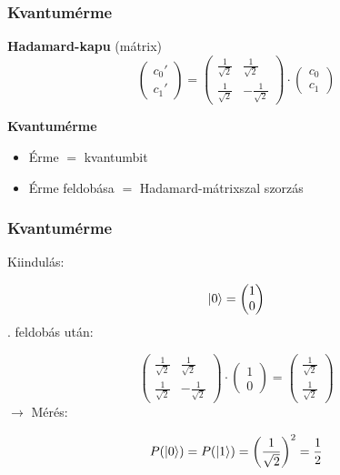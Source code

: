 \documentclass[aspectratio=169]{beamer}
\begin{document}
\begin{frame}
  \frametitle{Kvantumérme}

  \textbf{Hadamard-kapu} (mátrix)
  \[\begin{pmatrix} c_0' \\ c_1'
    \end{pmatrix} = \begin{pmatrix} \frac{1}{\sqrt{2}} & \frac{1}{\sqrt{2}}
      \\ \frac{1}{\sqrt{2}} & -\frac{1}{\sqrt{2}}\end{pmatrix} \cdot
    \begin{pmatrix} c_0 \\ c_1 \end{pmatrix}\]

  \pause
  \textbf{Kvantumérme}\\
  \begin{itemize}
    \item Érme $=$ kvantumbit
    \item Érme feldobása $=$ Hadamard-mátrixszal szorzás
  \end{itemize}
\end{frame}

\begin{frame}
  \frametitle{Kvantumérme}

  Kiindulás:

  \[\ket{0} = \begin{pmatrix} 1 \\ 0 \end{pmatrix}\]
  . feldobás után:

  \[\begin{pmatrix} \frac{1}{\sqrt{2}} & \frac{1}{\sqrt{2}}
      \\ \frac{1}{\sqrt{2}} & -\frac{1}{\sqrt{2}}\end{pmatrix} \cdot
    \begin{pmatrix} 1 \\ 0 \end{pmatrix} = \begin{pmatrix}
      \frac{1}{\sqrt{2}} \\ \frac{1}{\sqrt{2}}
    \end{pmatrix} \]
  \pause
  $\rightarrow$ Mérés:

  \[P(\ket{0}) = P(\ket{1}) = \left(\frac{1}{\sqrt{2}} \right)^2 = \frac{1}{2}\]


\end{frame}
\end{document}

